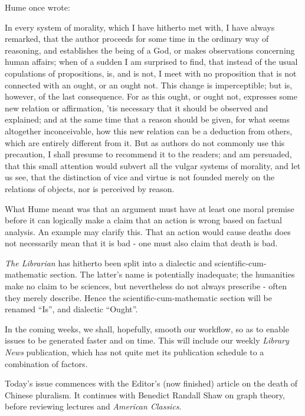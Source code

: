 Hume once wrote:

\begin{displayquote}

	In every system of morality, which I have hitherto met with, I have
	always remarked, that the author proceeds for some time in the ordinary
	way of reasoning, and establishes the being of a God, or makes
	observations concerning human affairs; when of a sudden I am surprised
	to find, that instead of the usual copulations of propositions, is, and
	is not, I meet with no proposition that is not connected with an ought,
	or an ought not. This change is imperceptible; but is, however, of the
	last consequence. For as this ought, or ought not, expresses some new
	relation or affirmation, 'tis necessary that it should be observed and
	explained; and at the same time that a reason should be given, for what
	seems altogether inconceivable, how this new relation can be a deduction
	from others, which are entirely different from it. But as authors do not
	commonly use this precaution, I shall presume to recommend it to the
	readers; and am persuaded, that this small attention would subvert all
	the vulgar systems of morality, and let us see, that the distinction of
	vice and virtue is not founded merely on the relations of objects, nor
	is perceived by reason.

\end{displayquote}

What Hume meant was that an argument must have at least one moral
premise before it can logically make a claim that an action is wrong
based on factual analysis. An example may clarify this. That an action
would cause deaths does not necessarily mean that it is bad - one must
also claim that death is bad.

\textit{The Librarian} has hitherto been split into a dialectic and
scientific-cum-mathematic section. The latter's name is potentially
inadequate; the humanities make no claim to be sciences, but
nevertheless do not always prescribe - often they merely describe. Hence
the scientific-cum-mathematic section will be renamed ``Is'', and
dialectic ``Ought''.

In the coming weeks, we shall, hopefully, smooth our workflow, so as
to enable issues to be generated faster and on time. This will include
our weekly \textit{Library News} publication, which has not quite met its
publication schedule to a combination of factors.

Today's issue commences with the Editor's (now finished) article on the death of Chinese pluralism. It continues with Benedict Randall Shaw on graph theory, before reviewing lectures and \textit{American Classics}.

